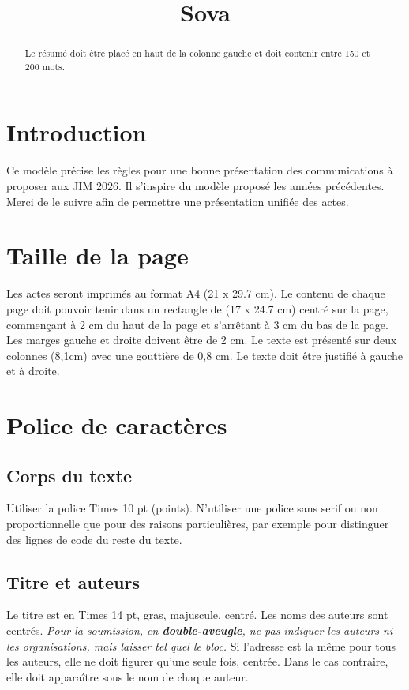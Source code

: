 \documentclass{article}
\title{Sova}
\begin{document}
%
\maketitle
%
\begin{abstract}
  Le résumé doit être placé en haut de la colonne gauche et doit contenir entre 150 et 200 mots.
\end{abstract}
%
\section{Introduction}\label{sec:introduction}

Ce modèle précise les règles pour une bonne présentation des communications à proposer aux JIM 2026. Il s'inspire du modèle proposé les années précédentes.
Merci de le suivre afin de permettre une présentation unifiée des actes. 


\section{Taille de la page}\label{sec:page_size}

Les actes seront imprimés au format A4 (21 x 29.7 cm). Le contenu de chaque page doit pouvoir tenir dans un rectangle de (17 x 24.7 cm) centré sur la page, commençant à 2 cm du haut de la page et s'arrêtant à  3 cm du bas de la page. Les marges gauche et droite doivent être de 2 cm. Le texte est présenté sur deux colonnes (8,1cm) avec une gouttière  de 0,8 cm. Le texte doit être justifié à gauche et à droite.

\section{Police de caractères}\label{sec:typeset_text}

\subsection{Corps du texte}\label{subsec:body}

Utiliser la police Times 10 pt (points). N'utiliser une police sans serif ou non proportionnelle que pour des raisons particulières, par exemple pour distinguer des lignes de code du reste du texte.

\subsection{Titre et auteurs}

Le titre est en Times 14 pt, gras, majuscule, centré. Les noms des auteurs sont centrés. 
\textit{Pour la soumission, en {\bfseries double-aveugle}, ne pas indiquer les auteurs ni les organisations, mais laisser tel quel le bloc.}
Si l'adresse est la même pour tous les auteurs, elle ne doit figurer qu'une seule fois, centrée. Dans le cas contraire, elle doit apparaître sous le nom de chaque auteur.
\end{document}
